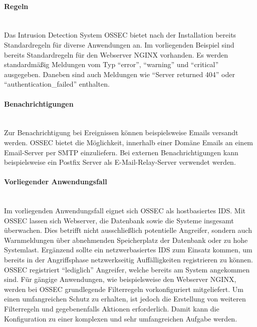 \paragraph{Regeln}
\noindent \\Das Intrusion Detection System OSSEC bietet nach der Installation bereits Standardregeln für diverse Anwendungen an. Im vorliegenden Beispiel sind bereits Standardregeln für den Webserver NGINX vorhanden. Es werden standardmäßig Meldungen vom Typ "`error"', "`warning"' und "`critical"' ausgegeben. Daneben sind auch Meldungen wie "`Server returned 404"' oder "`authentication\_failed"' enthalten. 

\paragraph{Benachrichtigungen}
\noindent \\Zur Benachrichtigung bei Ereignissen können beispielsweise Emails versandt werden. OSSEC bietet die Möglichkeit, innerhalb einer Domäne Emails an einem Email-Server per SMTP einzuliefern. Bei externen Benachrichtigungen kann beispielsweise ein Postfix Server als E-Mail-Relay-Server verwendet werden.  

\paragraph{Vorliegender Anwendungsfall}
\noindent \\Im vorliegenden Anwendungsfall eignet sich OSSEC als hostbasiertes IDS. Mit OSSEC lassen sich Webserver, die Datenbank sowie die Systeme insgesamt überwachen. Dies betrifft nicht ausschließlich potentielle Angreifer, sondern auch Warnmeldungen über abnehmenden Speicherplatz der Datenbank oder zu hohe Systemlast. Ergänzend sollte ein netzwerbasiertes IDS zum Einsatz kommen, um bereits in der Angriffsphase netzwerkseitig Auffälligkeiten registrieren zu können. OSSEC registriert "`lediglich"' Angreifer, welche bereits am System angekommen sind. Für gängige Anwendungen, wie beispielsweise den Webserver NGINX, werden bei OSSEC grundlegende Filterregeln vorkonfiguriert mitgeliefert. Um einen umfangreichen Schutz zu erhalten, ist jedoch die Erstellung von weiteren Filterregeln und gegebenenfalls Aktionen erforderlich. Damit kann die Konfiguration zu einer komplexen und sehr umfangreichen Aufgabe werden. 

